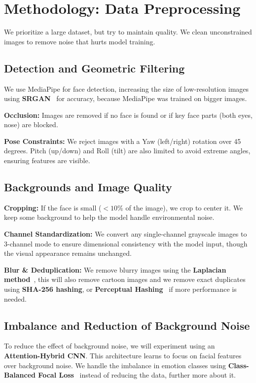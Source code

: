 \section{Methodology: Data Preprocessing}
\label{sec:data_preprocessing}

We prioritize a large dataset, but try to maintain quality. We clean unconstrained images to remove noise that hurts model training.

\subsection{Detection and Geometric Filtering}
We use MediaPipe for face detection, increasing the size of low-resolution images using \textbf{SRGAN}~\cite{Ledig2017SRGAN} for accuracy, because MediaPipe was trained on bigger images.

\noindent\textbf{Occlusion:} Images are removed if no face is found or if key face parts (both eyes, nose) are blocked.

\noindent\textbf{Pose Constraints:} We reject images with a Yaw (left/right) rotation over 45 degrees. Pitch (up/down) and Roll (tilt) are also limited to avoid extreme angles, ensuring features are visible.

\subsection{Backgrounds and Image Quality}
\noindent\textbf{Cropping:} If the face is small ($<10\%$ of the image), we crop to center it. We keep some background to help the model handle environmental noise.

\noindent\textbf{Channel Standardization:} We convert any single-channel grayscale images to 3-channel mode to ensure dimensional consistency with the model input, though the visual appearance remains unchanged.

\noindent\textbf{Blur \& Deduplication:} We remove blurry images using the \textbf{Laplacian method}~\cite{bansal2016blur}, this will also remove cartoon images and we remove exact duplicates using \textbf{SHA-256 hashing}, or \textbf{Perceptual Hashing}~\cite{kandepet2017perceptual} if more performance is needed.

\subsection{Imbalance and Reduction of Background Noise}
To reduce the effect of background noise, we will experiment using an \textbf{Attention-Hybrid CNN}. This architecture learns to focus on facial features over background noise. We handle the imbalance in emotion classes using \textbf{Class-Balanced Focal Loss}~\cite{cui2019class} instead of reducing the data, further more about it.
